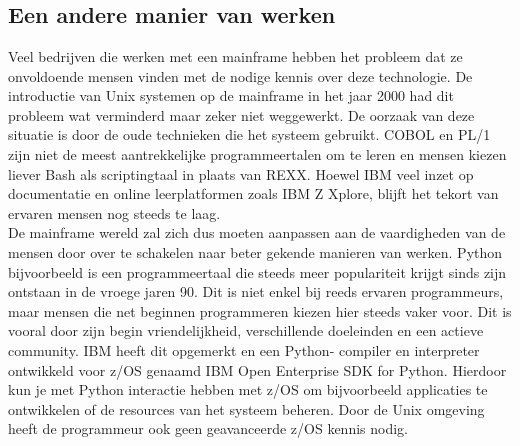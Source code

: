 \chapter{}%
\label{ch:stand-van-zaken}



\section{Een andere manier van werken}
\label{sec:andere-manier-van-werken}
Veel bedrijven die werken met een mainframe hebben het probleem dat ze onvoldoende mensen vinden met de nodige kennis over deze technologie. De introductie van Unix systemen op de mainframe in het jaar 2000 \autocite{Mertic2020} had dit probleem wat verminderd maar zeker niet weggewerkt. De oorzaak van deze situatie is door de oude technieken die het systeem gebruikt. COBOL en PL/1 zijn niet de meest aantrekkelijke programmeertalen om te leren en mensen kiezen liever Bash als scriptingtaal in plaats van REXX. Hoewel IBM veel inzet op documentatie en online leerplatformen zoals IBM Z Xplore, blijft het tekort van ervaren mensen nog steeds te laag. \\

De mainframe wereld zal zich dus moeten aanpassen aan de vaardigheden van de mensen door over te schakelen naar beter gekende manieren van werken. 
Python bijvoorbeeld is een programmeertaal die steeds meer populariteit krijgt sinds zijn ontstaan in de vroege jaren 90. Dit is niet enkel bij reeds ervaren programmeurs, maar mensen die net beginnen programmeren kiezen hier steeds vaker voor. Dit is vooral door zijn begin vriendelijkheid, verschillende doeleinden en een actieve community. \autocite{Johnson2023}
IBM heeft dit opgemerkt en een Python- compiler en interpreter ontwikkeld voor z/OS genaamd IBM Open Enterprise SDK for Python. Hierdoor kun je met Python interactie hebben met z/OS om bijvoorbeeld applicaties te ontwikkelen of de resources van het systeem beheren. Door de Unix omgeving heeft de programmeur ook geen geavanceerde z/OS kennis nodig. \autocite{Klaey2023}

